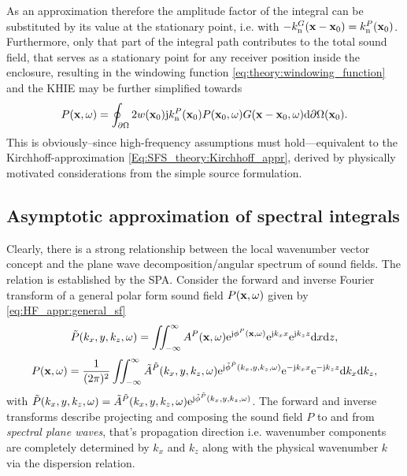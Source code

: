 As an approximation therefore the amplitude factor of the integral can be substituted by its value at the stationary point, i.e. with $- k_{\mathrm{n}}^G(\mathbf{x}-\mathbf{x}_0) = k_{\mathrm{n}}^P(\mathbf{x}_0)$.
Furthermore, only that part of the integral path contributes to the total sound field, that serves as a stationary point for any receiver position inside the enclosure,
resulting in the windowing function \eqref{eq:theory:windowing_function} and the KHIE may be further simplified towards
\begin{equation}
P(\mathbf{x},\omega) = 
\oint_{\partial \Omega} 
2 w(\mathbf{x}_0) \mathrm{j} k_{\mathrm{n}}^P(\mathbf{x}_0) 
P(\mathbf{x}_0,\omega) G(\mathbf{x}-\mathbf{x}_0,\omega)  \mathrm{d} \partial \Omega( \mathbf{x}_0).
\label{Eq:HF_appr:Kirchhoff_approximation}
\end{equation}
This is obviously--since high-frequency assumptions must hold---equivalent to the Kirchhoff-approximation \eqref{Eq:SFS_theory:Kirchhoff_appr}, derived by physically motivated considerations from the simple source formulation.

\subsection{Asymptotic approximation of spectral integrals}
Clearly, there is a strong relationship between the local wavenumber vector concept and the plane wave decomposition/angular spectrum of sound fields.
The relation is established by the SPA.
Consider the forward and inverse Fourier transform of a general polar form sound field $P(\mathbf{x},\omega)$ given by \eqref{eq:HF_appr:general_sf}
\begin{equation}
\tilde{P}(k_x,y,k_z,\omega) = \iint_{-\infty}^{\infty} A^P(\mathbf{x},\omega)\mathrm{e}^{\mathrm{j} \phi^P(\mathbf{x},\omega)} \mathrm{e}^{\mathrm{j} k_x x} \mathrm{e}^{\mathrm{j} k_z z} \mathrm{d} x \mathrm{d} z,
\label{eq:forward_transform}
\end{equation}
\begin{equation}
P(\mathbf{x},\omega) = \frac{1}{(2\pi)^2} \iint_{-\infty}^{\infty} \tilde{A}^{\tilde{P}}(k_x,y,k_z,\omega)\mathrm{e}^{\mathrm{j} \tilde{\phi}^{\tilde{P}}(k_x,y,k_z,\omega)}  \mathrm{e}^{-\mathrm{j} k_x x} \mathrm{e}^{-\mathrm{j} k_z z} \mathrm{d} k_x \mathrm{d} k_z,
\label{eq:inverse_transform}
\end{equation}
with $\tilde{P}(k_x,y,k_z,\omega) =\tilde{A}^{\tilde{P}}(k_x,y,k_z,\omega)\mathrm{e}^{\mathrm{j} \tilde{\phi}^{\tilde{P}}(k_x,y,k_z,\omega)}$.
The forward and inverse transforms describe projecting and composing the sound field $P$ to and from \emph{spectral plane waves}, that's propagation direction i.e. wavenumber components are completely determined by $k_x$ and $k_z$ along with the physical wavenumber $k$ via the dispersion relation.

